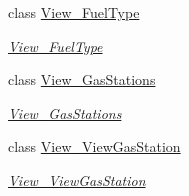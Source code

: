 \begin{DoxyCompactItemize}
class \mbox{\hyperlink{class_gasoline_desktop_1_1_view___fuel_type}{View\+\_\+\+Fuel\+Type}}
\begin{DoxyCompactList}\small\item\em \mbox{\hyperlink{class_gasoline_desktop_1_1_view___fuel_type}{View\+\_\+\+Fuel\+Type}} \end{DoxyCompactList}\item 
class \mbox{\hyperlink{class_gasoline_desktop_1_1_view___gas_stations}{View\+\_\+\+Gas\+Stations}}
\begin{DoxyCompactList}\small\item\em \mbox{\hyperlink{class_gasoline_desktop_1_1_view___gas_stations}{View\+\_\+\+Gas\+Stations}} \end{DoxyCompactList}\item 
class \mbox{\hyperlink{class_gasoline_desktop_1_1_view___view_gas_station}{View\+\_\+\+View\+Gas\+Station}}
\begin{DoxyCompactList}\small\item\em \mbox{\hyperlink{class_gasoline_desktop_1_1_view___view_gas_station}{View\+\_\+\+View\+Gas\+Station}} \end{DoxyCompactList}\end{DoxyCompactItemize}
